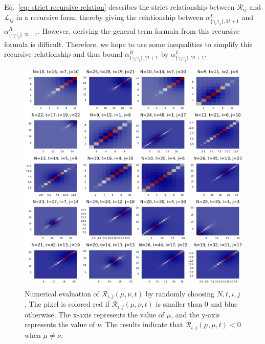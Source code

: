 \documentclass[showpacs,twocolumn,aps,prx,long bibliography,superscriptaddress,notitlepage]{revtex4-1}
\newcommand{\alpl}{\alpha_{\{\gamma_i\gamma_j\}, 2t+1}^{L}}
\newcommand{\alpr}{\alpha_{\{\gamma_i\gamma_j\}, 2t+1}^{R}}
\begin{document}
Eq.~\eqref{eq: strict recursive relation} describes the strict relationship between $\mathscr{R}_{ij}$ and $\mathscr{L}_{ij}$ in a recursive form, thereby giving the relationship between $\alpl$ and $\alpr$. However, deriving the general term formula from this recursive formula is difficult. Therefore, we hope to use some inequalities to simplify this recursive relationship and thus bound $\alpr$ by $\alpl$.


\begin{figure}[t]
    \centering
    \includegraphics[width=\linewidth]{figures/appendix/assumption.pdf}
    \caption{ Numerical evaluation of  $\mathscr{R}_{i, j}(\mu, \nu, t)$ by randomly choosing $N, t, i, j$. The pixel is colored red if $\mathscr{R}_{i, j}(\mu, \nu, t)$ is smaller than 0 and blue otherwise. The x-axis represents the value of $\mu$, and the y-axis represents the value of $\nu$. The results indicate that $\mathscr{R}_{i, j}(\mu, \mu, t)<0$ when $\mu\neq\nu$.}
    \label{fig: appendix assumption}
\end{figure}
\end{document}
